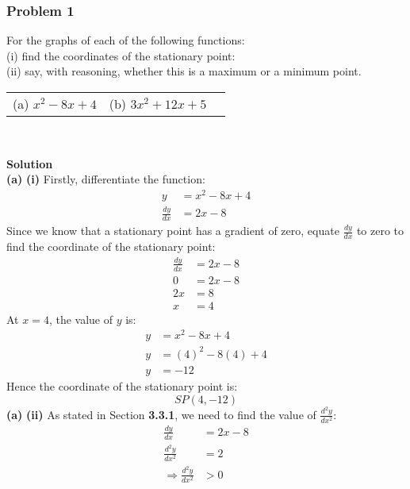 \documentclass[hidelinks, a4paper, 12pt]{article}
\newcommand{\bd}{\textbf}
\newcommand{\n}{\\[\baselineskip]}
\newcommand{\thus}{\Rightarrow}
\newcommand{\dydx}{\frac{dy}{dx}}
\newcommand{\dydxx}{\frac{d^2y}{dx^2}}
\begin{document}
            \subsubsection{Problem 1}
                For the graphs of each of the following functions:\n
                (i) find the coordinates of the stationary point:\n
                (ii) say, with reasoning, whether this is a maximum or a minimum point.
                \begin{center}
                    \begin{tabularx}{\textwidth} {
                        X X X}
                        (a) $x^2 - 8x + 4$ & (b) $3x^2+12x+5$
                    \end{tabularx}\n
                \end{center}
                \bd{Solution}\n
                \bd{(a)} \bd{(i)} Firstly, differentiate the function:
                \[\begin{split}
                    y &= x^2 - 8x + 4\\
                    \dydx &= 2x - 8
                \end{split}\]
                Since we know that a stationary point has a gradient of zero, equate $\dydx$ to zero to find the coordinate of the stationary point:
                \[\begin{split}
                    \dydx &= 2x - 8\\
                    0 &= 2x - 8\\
                    2x &= 8\\
                    x &= 4
                \end{split}\]
                At $x=4$, the value of $y$ is:
                \[\begin{split}
                    y &= x^2 - 8x + 4\\
                    y &= (4)^2 - 8(4) + 4\\
                    y &= -12
                \end{split}\]
                Hence the coordinate of the stationary point is:
                \[SP(4, -12)\]
                \bd{(a)} \bd{(ii)} As stated in Section \bd{3.3.1}, we need to find the value of $\dydxx$:
                \[\begin{split}
                    \dydx &= 2x-8\\
                    \dydxx &= 2\\
                    \thus \dydxx &> 0
                \end{split}\]
\end{document}
